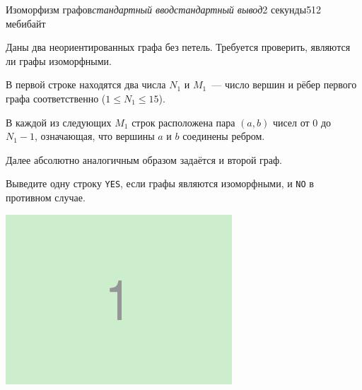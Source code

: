 \begin{problem}{Изоморфизм графов}{\textsl{стандартный ввод}}{\textsl{стандартный вывод}}{2 секунды}{512 мебибайт}{}

Даны два неориентированных графа без петель. Требуется проверить, являются ли 
графы изоморфными.

\InputFile

В первой строке находятся два числа $N_1$ и $M_1$~---
число вершин и рёбер первого графа соответственно ($1 \le N_1 \le 15$).

В каждой из следующих $M_1$ строк расположена пара $(a, b)$ чисел от 0 до $N_1 - 1$,
означающая, что вершины $a$ и $b$ соединены ребром.

Далее абсолютно аналогичным образом задаётся и второй граф.

\OutputFile

Выведите одну строку \texttt{YES}, если графы 
являются изоморфными, и \texttt{NO} в противном случае.

\Example

\begin{example}%
%
\end{example}


\includegraphics{static/fig1.png}

\Example

\begin{example}%
%
\end{example}


\end{problem}
